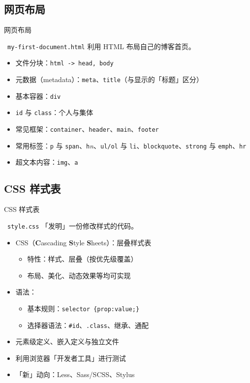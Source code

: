 \documentclass{beamer}
\begin{document}
\subsection{网页布局}
\begin{frame}{网页布局}
\begin{block}{\faCode\ \texttt{my-first-document.html}}
利用 HTML 布局自己的博客首页。
\end{block}

\pause
\begin{itemize}
    \item 文件分块：\texttt{html -> head, body}
    \item 元数据（metadata）：\texttt{meta}、\texttt{title}（与显示的「标题」区分）
    \item 基本容器：\texttt{div}
    \item \texttt{id} 与 \texttt{class}：个人与集体
    \item 常见框架：\texttt{container}、\texttt{header}、\texttt{main}、\texttt{footer}
    \item 常用标签：\texttt{p} 与 \texttt{span}、\texttt{h}\emph{n}、\texttt{ul/ol}
    与 \texttt{li}、\texttt{blockquote}、\texttt{strong} 与 \texttt{emph}、\texttt{hr}
    \item 超文本内容：\texttt{img}、\texttt{a}
\end{itemize}
\end{frame}

\subsection{CSS 样式表}
\begin{frame}{CSS 样式表}
\begin{block}{\faCode\ \texttt{style.css}}
「发明」一份修改样式的代码。
\end{block}

\pause
\begin{itemize}
    \item CSS（\textbf{C}ascading \textbf{S}tyle \textbf{S}heets）：层叠样式表
    \begin{itemize}
        \item 特性：样式、层叠（按优先级覆盖）
        \item 布局、美化、动态效果等均可实现
    \end{itemize}
    \item 语法：
    \begin{itemize}
        \item 基本规则：\texttt{selector \{prop:value;\} }
        \item 选择器语法：\texttt{\#id}、\texttt{.class}、继承、通配
    \end{itemize}
    \item 元素级定义、嵌入定义与独立文件
    \item 利用浏览器「开发者工具」进行测试
    \item 「新」动向：Less、Sass/SCSS、Stylus
\end{itemize}
\end{frame}
\end{document}
